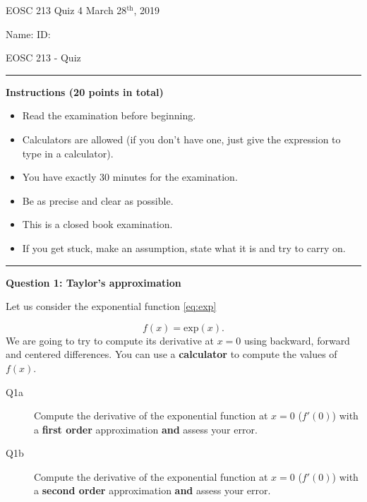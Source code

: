 \documentclass{article}
\begin{document}
\pagestyle{empty}

\large{EOSC 213 Quiz 4} \hspace{10cm} \large{March 28$^{\textrm{th}}$, 2019}

\large{Name:} \hspace{12cm} \large{ID: }
\begin{center}
\Huge{EOSC 213 - Quiz}
\end{center}

\rule{\textwidth}{1pt}

\large{\textbf{Instructions (20 points in total)}}
\begin{multicols}{2}
\begin{itemize}
\item Read the examination before beginning.
\item Calculators are allowed (if you don't have one, just give the expression to type in a calculator).
\item You have exactly 30 minutes for the examination.
\item Be as precise and clear as possible.
\item This is a closed book examination.
\item If you get stuck, make an assumption, state what it is and try to carry on.
\end{itemize} 
\end{multicols}


\rule{\textwidth}{1pt}

\textbf{Question 1: Taylor's approximation}

Let us consider the exponential function \ref{eq:exp}

\begin{equation}
f(x) = \mathrm{exp}(x). \label{eq:exp}
\end{equation} We are going to try to compute its derivative at $x = 0$ using backward, forward and centered differences. You can use a \textbf{calculator} to compute the values of $f(x)$.


\begin{description}
\item [Q1a] Compute the derivative of the exponential function at $x = 0$ ($f'(0)$) with a \textbf{first order} approximation \textbf{and} assess your error. 
\vspace{3cm}
\item [Q1b] Compute the derivative of the exponential function at $x = 0$ ($f'(0)$) with a \textbf{second order} approximation \textbf{and} assess your error. 
\vspace{3cm}

\end{description}
\end{document}
